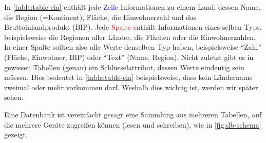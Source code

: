 \begin{table}[H]
  \centering
  \tiny
  \caption{Typische Tabellenstruktur anhand einer Tabelle mit Informationen zu Ländern}
  \label{table:table-cia}
\end{table}
In \cref{table:table-cia} enthält jede \textcolor{blue}{Zeile} Informationen zu einem Land: dessen Name, die Region (=Kontinent), Fläche, die Einwohnerzahl und das Bruttoinlandprodukt (BIP).
Jede \textcolor{red}{Spalte} enthält Informationen eines selben Typs, beispielsweise die Regionen aller Länder, die Flächen oder die Einwohnerzahlen. 
In einer Spalte sollten also alle Werte denselben Typ haben, beispielsweise \enquote{Zahl} (Fläche, Einwohner, BIP) oder
\enquote{Text} (Name, Region). 
Nicht zuletzt gibt es in gewissen Tabellen (genau) ein Schlüsselattribut, dessen Werte eindeutig sein müssen. 
Dies bedeutet in \cref{table:table-cia} beispielsweise, dass kein Ländername zweimal oder mehr vorkommen darf. Weshalb dies wichtig ist, werden wir später sehen.

Eine Datenbank ist vereinfacht gesagt eine Sammlung aus mehreren Tabellen, auf die mehrere Geräte zugreifen können (lesen und schreiben), wie in \cref{fig:db-schema} gezeigt.



